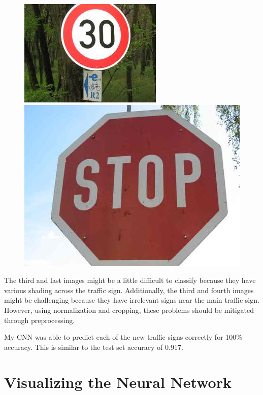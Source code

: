 \documentclass[12pt]{article}
\begin{document}
\begin{figure}[!h]
\includegraphics[scale = 0.8]{traffic-signs-data/images.jpg}
\includegraphics[scale = 0.3]{traffic-signs-data/Stop_sign.jpg}
\end{figure}

The third and last images might be a little difficult to classify because they have various shading across the traffic sign. Additionally, the third and fourth images might be challenging because they have irrelevant signs near the main traffic sign. However, using normalization and cropping, these problems should be mitigated through preprocessing.

My CNN was able to predict each of the new traffic signs correctly for 100\% accuracy. This is similar to the test set accuracy of 0.917.


\section{Visualizing the Neural Network}



\end{document}

